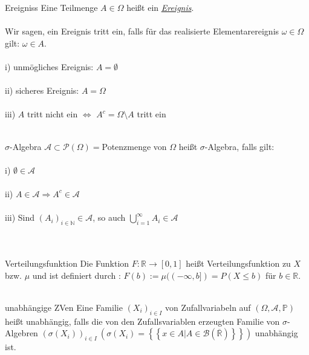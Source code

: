 \documentclass[avery5371,grid,frame]{flashcards} %
\newcommand{\R}{\mathbb{R}}
\begin{document}

\begin{flashcard}[Definition]{Ereigniss}
  Eine Teilmenge $A \in \Omega$ heißt ein \underline{\textit{Ereignis}}.\\\\
Wir sagen, ein Ereignis tritt ein, falls für das realisierte Elementarereignis $\omega \in \Omega$ gilt: $\omega \in A$.\\\\
i) unmögliches Ereignis: $A=\emptyset$\\\\
ii) sicheres Ereignis: $A=\Omega$\\\\
iii) $A$ tritt nicht ein $\Leftrightarrow$ $A^c=\Omega\setminus A$ tritt ein \\\\
\end{flashcard}

\begin{flashcard}[Definition]{$\sigma$-Algebra}
  $\mathcal{A}\subset \mathcal{P}(\Omega)=$Potenzmenge von $\Omega$ heißt $\sigma$-Algebra, falls gilt:\\\\
i) $\emptyset \in \mathcal{A}$\\\\
ii) $A\in \mathcal{A} \Rightarrow A^c \in \mathcal{A}$\\\\
iii) Sind $(A_i)_{i \in \mathbb{N}} \in \mathcal{A}$, so auch $\bigcup\limits_{i=1}^\infty A_i \in \mathcal{A}$\\\\\\
\end{flashcard}


\begin{flashcard}[Definition]{Verteilungsfunktion}
  Die Funktion $F:\R \rightarrow [0,1]$ heißt Verteilungsfunktion zu $X$ bzw. $\mu$ und ist definiert durch : $F(b):=\mu((-\infty,b])=P(X\leq b)$ für $b \in \R$.\\\\
\end{flashcard}

\begin{flashcard}{unabhängige ZVen}
  Eine Familie $\left(X_{i}\right)_{i\in I}$ von Zufallvariabeln auf
$\left(\Omega,\mathcal{A},\mathbb{P}\right)$ heißt unabhängig, falls
die von den Zufallsvariablen erzeugten Familie von $\sigma$-Algebren
$\left(\sigma\left(X_{i}\right)\right)_{i\in I}\ \left(\sigma\left(X_{i}\right)=\left\{ \left\{ x\in A|A\in\mathcal{B}\left(\overline{\mathbb{R}}\right)\right\} \right\} \right)
$
unabhängig ist.
\end{flashcard}
\end{document}
